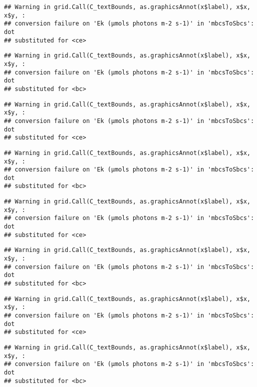 \documentclass[
]{article}
\begin{document}
\begin{verbatim}
## Warning in grid.Call(C_textBounds, as.graphicsAnnot(x$label), x$x, x$y, :
## conversion failure on 'Ek (μmols photons m-2 s-1)' in 'mbcsToSbcs': dot
## substituted for <ce>
\end{verbatim}

\begin{verbatim}
## Warning in grid.Call(C_textBounds, as.graphicsAnnot(x$label), x$x, x$y, :
## conversion failure on 'Ek (μmols photons m-2 s-1)' in 'mbcsToSbcs': dot
## substituted for <bc>
\end{verbatim}

\begin{verbatim}
## Warning in grid.Call(C_textBounds, as.graphicsAnnot(x$label), x$x, x$y, :
## conversion failure on 'Ek (μmols photons m-2 s-1)' in 'mbcsToSbcs': dot
## substituted for <ce>
\end{verbatim}

\begin{verbatim}
## Warning in grid.Call(C_textBounds, as.graphicsAnnot(x$label), x$x, x$y, :
## conversion failure on 'Ek (μmols photons m-2 s-1)' in 'mbcsToSbcs': dot
## substituted for <bc>
\end{verbatim}

\begin{verbatim}
## Warning in grid.Call(C_textBounds, as.graphicsAnnot(x$label), x$x, x$y, :
## conversion failure on 'Ek (μmols photons m-2 s-1)' in 'mbcsToSbcs': dot
## substituted for <ce>
\end{verbatim}

\begin{verbatim}
## Warning in grid.Call(C_textBounds, as.graphicsAnnot(x$label), x$x, x$y, :
## conversion failure on 'Ek (μmols photons m-2 s-1)' in 'mbcsToSbcs': dot
## substituted for <bc>
\end{verbatim}

\begin{verbatim}
## Warning in grid.Call(C_textBounds, as.graphicsAnnot(x$label), x$x, x$y, :
## conversion failure on 'Ek (μmols photons m-2 s-1)' in 'mbcsToSbcs': dot
## substituted for <ce>
\end{verbatim}

\begin{verbatim}
## Warning in grid.Call(C_textBounds, as.graphicsAnnot(x$label), x$x, x$y, :
## conversion failure on 'Ek (μmols photons m-2 s-1)' in 'mbcsToSbcs': dot
## substituted for <bc>
\end{verbatim}
\end{document}
